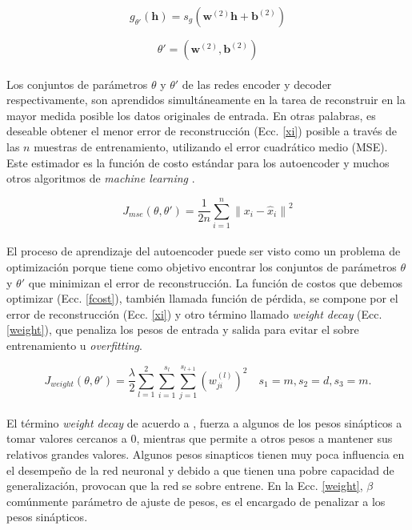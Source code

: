 \documentclass[12pt]{article}%
\begin{document}
\begin{equation}
\label{g}
g_{\theta'}(\textbf{h})=s_{g}(\textbf{w}^{(2)}\textbf{h}+\textbf{b}^{(2)})
\end{equation}

\begin{equation}
\label{teta2}
\theta'=(\textbf{w}^{(2)},\textbf{b}^{(2)})
\end{equation}

\paragraph{}
Los conjuntos de parámetros $\theta$ y $\theta'$ de las redes encoder y decoder respectivamente, son aprendidos simultáneamente en la tarea de reconstruir en la mayor medida posible los datos originales de entrada. En otras palabras, es deseable obtener el menor error de reconstrucción (Ecc. \ref{xi}) posible a través de las $n$ muestras de entrenamiento, utilizando el error cuadrático medio (MSE). Este estimador es la función de costo estándar para los autoencoder y muchos otros algoritmos de \textit{machine learning} \cite{mining}.

\begin{equation}
\label{xi}
J_{mse}(\theta,\theta')=\frac{1}{2n}\sum_{i=1}^{n}{\|x_{i}-\hat{x}_{i}\|}^2
\end{equation}

\paragraph{}
El proceso de aprendizaje del autoencoder puede ser visto como un problema de optimización porque tiene como objetivo encontrar los conjuntos de parámetros $\theta$ y $\theta'$ que minimizan el error de reconstrucción. La función de costos que debemos optimizar (Ecc. \ref{fcost}), también llamada función de pérdida, se compone por el error de reconstrucción (Ecc. \ref{xi}) y otro término llamado \textit{weight decay} (Ecc. \ref{weight}), que penaliza los pesos de entrada y salida para evitar el sobre entrenamiento u \textit{overfitting}.

\begin{equation}
\label{weight}
J_{weight}(\theta,\theta')=\frac{\lambda}{2}\sum_{l=1}^{2}\sum_{i=1}^{s_l}\sum_{j=1}^{s_{l+1}}({w^{(l)}_{ji}})^2 \quad s_{1}=m,s_{2}=d,s_{3}=m.
\end{equation}

\paragraph{}
El término \textit{weight decay} de acuerdo a \cite{haykin}, fuerza a algunos de los pesos sinápticos a tomar valores cercanos a 0, mientras que permite a otros pesos a mantener sus relativos grandes valores. Algunos pesos sinapticos tienen muy poca influencia en el desempeño de la red neuronal y debido a que tienen una pobre capacidad de generalización, provocan que la red se sobre entrene. En la Ecc. \ref{weight}, $\beta$ comúnmente parámetro de ajuste de pesos, es el encargado de penalizar a los pesos sinápticos.
\end{document}
